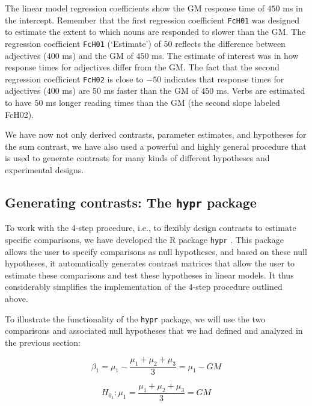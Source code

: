\documentclass[
  12pt,
]{krantz}
\theoremstyle{definition}
\theoremstyle{definition}
\theoremstyle{definition}
\theoremstyle{definition}
\theoremstyle{remark}
\begin{document}
The linear model regression coefficients show the GM response time of \(450\) ms in the intercept. Remember that the first regression coefficient \texttt{FcH01} was designed to estimate the extent to which nouns are responded to slower than the GM. The regression coefficient \texttt{FcH01} (`Estimate') of \(50\) reflects the difference between adjectives (\(400\) ms) and the GM of \(450\) ms. The estimate of interest was in how response times for adjectives differ from the GM. The fact that the second regression coefficient \texttt{FcH02} is close to \(-50\) indicates that response times for adjectives (\(400\) ms) are 50 ms faster than the GM of \(450\) ms. Verbs are estimated to have \(50\) ms longer reading times than the GM (the second slope labeled FcH02).

We have now not only derived contrasts, parameter estimates, and hypotheses for the sum contrast, we have also used a powerful and highly general procedure that is used to generate contrasts for many kinds of different hypotheses and experimental designs.

\hypertarget{generating-contrasts-the-hypr-package}{%
\subsection{\texorpdfstring{Generating contrasts: The \texttt{hypr} package}{Generating contrasts: The hypr package}}\label{generating-contrasts-the-hypr-package}}

To work with the 4-step procedure, i.e., to flexibly design contrasts to estimate specific comparisons, we have developed the R package \texttt{hypr} \citep{rabe2020hypr}. This package allows the user to specify comparisons as null hypotheses, and based on these null hypotheses, it automatically generates contrast matrices that allow the user to estimate these comparisons and test these hypotheses in linear models. It thus considerably simplifies the implementation of the 4-step procedure outlined above.

To illustrate the functionality of the \texttt{hypr} package, we will use the two comparisons and associated null hypotheses that we had defined and analyzed in the previous section:

\begin{equation}
\beta_1 = \mu_1 - \frac{\mu_1+\mu_2+\mu_3}{3} = \mu_1 - GM
\end{equation}

\begin{equation}
H_{0_1}: \mu_1 = \frac{\mu_1+\mu_2+\mu_3}{3} = GM
\end{equation}
\end{document}

